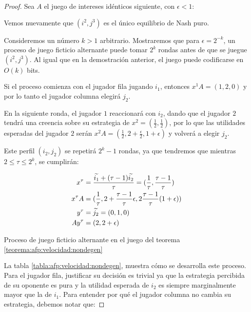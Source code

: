 \begin{proof}
    Sea $A$ el juego de intereses idénticos siguiente, con $\epsilon < 1$:

    

    Vemos nuevamente que $(i^2, j^3)$ es el único equilibrio de Nash puro.

    Consideremos un número $k > 1$ arbitrario. Mostraremos que para $\epsilon = 2^{-k}$, un proceso de juego ficticio alternante puede tomar $2^k$ rondas antes de que se juegue $(i^2, j^3)$. Al igual que en la demostración anterior, el juego puede codificarse en $O(k)$ bits.

    Si el proceso comienza con el jugador fila jugando $i_1$, entonces $x^1A = (1, 2, 0)$ y por lo tanto el jugador columna elegirá $j_2$.

    En la siguiente ronda, el jugador $1$ reaccionará con $i_2$, dando que el jugador $2$ tendrá una creencia sobre su estrategia de $x^2 = (\frac{1}{2},\frac{1}{2})$, por lo que las utilidades esperadas del jugador $2$ serán $x^2A = (\frac{1}{2}, 2 + \frac{\epsilon}{2}, 1 + \epsilon)$ y volverá a elegir $j_2$.

    Este perfil $(i_2, j_2)$ se repetirá $2^k - 1$ rondas, ya que tendremos que mientras $2 \le \tau \le 2^k$, se cumplirán:

    \begin{align*}
        x^\tau     &= \frac{\widetilde{i_1} + (\tau - 1) \widetilde{i_2}}{\tau} = (\frac{1}{\tau}, \frac{\tau - 1}{\tau}) \\
        x^{\tau}A  &= (\frac{1}{\tau}, 2+\frac{\tau - 1}{\tau}\epsilon, 2\frac{\tau - 1}{\tau}(1+\epsilon)) \\
        y^\tau     &= \widetilde{j_2} = (0, 1, 0) \\
        Ay^\tau    &= (2, 2 + \epsilon) \\
    \end{align*}

    \begin{table}
        
        \caption{Proceso de juego ficticio alternante en el juego del teorema \ref{teorema:afp:velocidad:nondegen}}
        \label{tabla:afp:velocidad:nondegen}
    \end{table}

    La tabla \ref{tabla:afp:velocidad:nondegen}, muestra cómo se desarrolla este proceso. Para el jugador fila, justificar su decisión es trivial ya que la estrategia percibida de su oponente es pura y la utilidad esperada de  $i_2$ es siempre marginalmente mayor que la de $i_1$. Para entender por qué el jugador columna no cambia su estrategia, debemos notar que:


\end{proof}
